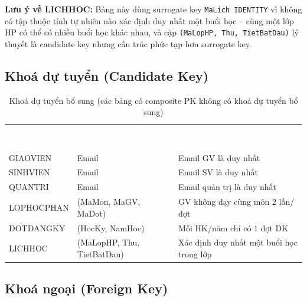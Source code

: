 \documentclass[13pt, a4paper]{article}
\begin{document}
\noindent \textbf{Lưu ý về LICHHOC:} Bảng này dùng surrogate key \texttt{MaLich IDENTITY} vì không có tập thuộc tính tự nhiên nào xác định duy nhất một buổi học -- cùng một lớp HP có thể có nhiều buổi học khác nhau, và cặp \texttt{(MaLopHP, Thu, TietBatDau)} lý thuyết là candidate key nhưng cấu trúc phức tạp hơn surrogate key.

\subsection{Khoá dự tuyển (Candidate Key)}

\begin{table}[H]
\centering
\renewcommand{\arraystretch}{1.35}
\begin{tabular}{p{3.5cm} p{5cm} p{5cm}}
  \rowcolor{tableheadbg}
  \textcolor{white}{\textbf{Quan Hệ}} &
  \textcolor{white}{\textbf{Khoá Dự Tuyển Bổ Sung}} &
  \textcolor{white}{\textbf{Lý Do}} \\
  \rowcolor{white}      GIAOVIEN     & Email                               & Email GV là duy nhất \\
  \rowcolor{tablerowalt}SINHVIEN     & Email                               & Email SV là duy nhất \\
  \rowcolor{white}      QUANTRI      & Email                               & Email quản trị là duy nhất \\
  \rowcolor{tablerowalt}LOPHOCPHAN   & (MaMon, MaGV, MaDot)               & GV không dạy cùng môn 2 lần/đợt \\
  \rowcolor{white}      DOTDANGKY    & (HocKy, NamHoc)                     & Mỗi HK/năm chỉ có 1 đợt DK \\
  \rowcolor{tablerowalt}LICHHOC      & (MaLopHP, Thu, TietBatDau)          & Xác định duy nhất một buổi học trong lớp \\
\end{tabular}
\caption{Khoá dự tuyển bổ sung (các bảng có composite PK không có khoá dự tuyển bổ sung)}
\end{table}

\subsection{Khoá ngoại (Foreign Key)}
\end{document}
